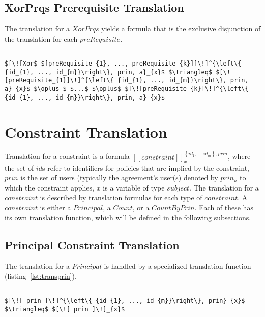 \subsection{XorPrqs Prerequisite Translation}
The translation for a $XorPrqs$ yields a formula that is the exclusive disjunction of the translation for each $preRequisite$.


\lstset{mathescape, language=AST}  
\begin{lstlisting}[frame=single, caption={Prerequisite Translation {$\colon$} Exclusive Disjunction},label={lst:transpreRequisiteXorPrqs}]

$[\![Xor$ $[preRequisite_{1}, ..., preRequisite_{k}]]\!]^{\left\{ {id_{1}, ..., id_{m}}\right\}, prin, a}_{x}$ $\triangleq$ $[\![preRequisite_{1}]\!]^{\left\{ {id_{1}, ..., id_{m}}\right\}, prin, a}_{x}$ $\oplus $ $...$ $\oplus$ $[\![preRequisite_{k}]\!]^{\left\{ {id_{1}, ..., id_{m}}\right\}, prin, a}_{x}$

\end{lstlisting}


\section{Constraint Translation}

Translation for a constraint is a formula $[\![constraint]\!]^{\left\{ {id_{1}, ..., id_{m}}\right\}, prin}_{x}$, where the set of $id$s refer to identifiers for policies that are implied by the constraint, $prin$ is the set of users (typically the agreement's user(s) denoted by $prin_{u}$ to which the constraint applies, $x$ is a variable of type $subject$. The translation for a $constraint$ is described by translation formulas for each type of $constraint$. A $constraint$ is either a $Principal$, a $Count$, or a $CountByPrin$. Each of these has its own translation function, which will be defined in the following subsections.

\subsection{Principal Constraint Translation}
The translation for a $Principal$ is handled by a specialized translation function (listing~\ref{lst:transprin}).   

\lstset{mathescape, language=AST}  
\begin{lstlisting}[frame=single, caption={Constraint Translation {$\colon$} Principal},label={lst:transconstraintPrin}]

$[\![ prin ]\!]^{\left\{ {id_{1}, ..., id_{m}}\right\}, prin}_{x}$ $\triangleq$ $[\![ prin ]\!]_{x}$ 
\end{lstlisting}

